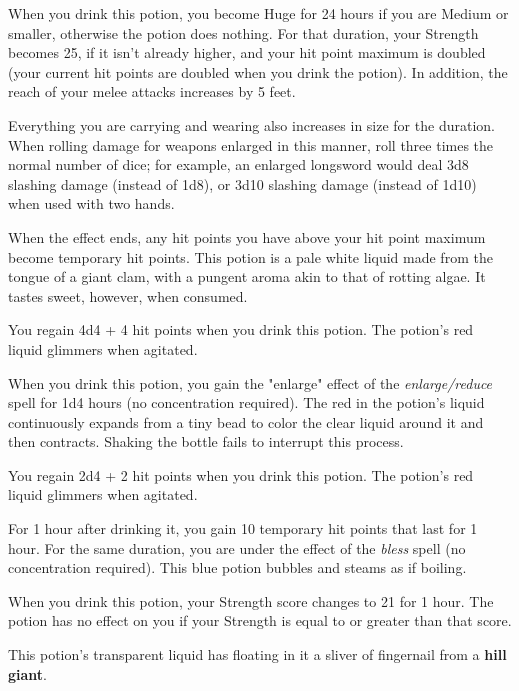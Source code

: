 \documentclass[10pt,a4paper,twoside,bg=print,twocolumn,openany,nodeprecatedcode]{dndbook}
\begin{document}
When you drink this potion, you become Huge for 24 hours if you are Medium or smaller, otherwise the potion does nothing. For that duration, your Strength becomes 25, if it isn't already higher, and your hit point maximum is doubled (your current hit points are doubled when you drink the potion). In addition, the reach of your melee attacks increases by 5 feet.

Everything you are carrying and wearing also increases in size for the duration. When rolling damage for weapons enlarged in this manner, roll three times the normal number of dice; for example, an enlarged longsword would deal 3d8 slashing damage (instead of 1d8), or 3d10 slashing damage (instead of 1d10) when used with two hands.

When the effect ends, any hit points you have above your hit point maximum become temporary hit points. This potion is a pale white liquid made from the tongue of a giant clam, with a pungent aroma akin to that of rotting algae. It tastes sweet, however, when consumed.

You regain 4d4 + 4 hit points when you drink this potion. The potion's red liquid glimmers when agitated.

When you drink this potion, you gain the "enlarge" effect of the \textit{enlarge/reduce} spell for 1d4 hours (no concentration required). The red in the potion's liquid continuously expands from a tiny bead to color the clear liquid around it and then contracts. Shaking the bottle fails to interrupt this process.

You regain 2d4 + 2 hit points when you drink this potion. The potion's red liquid glimmers when agitated.

For 1 hour after drinking it, you gain 10 temporary hit points that last for 1 hour. For the same duration, you are under the effect of the \textit{bless} spell (no concentration required). This blue potion bubbles and steams as if boiling.

When you drink this potion, your Strength score changes to 21 for 1 hour. The potion has no effect on you if your Strength is equal to or greater than that score.

This potion's transparent liquid has floating in it a sliver of fingernail from a \textbf{hill giant}.
\end{document}
